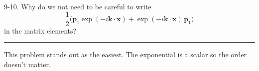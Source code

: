 \documentclass[12pt]{article}
\begin{document}
9-10.
Why do we not need to be careful to write
\begin{equation*}
\frac{1}{2}
\big(
\mathbf p_1\exp(-i\mathbf k\cdot\mathbf x)
+\exp(-i\mathbf k\cdot\mathbf x)\,\mathbf p_1
\big)
\end{equation*}
in the matrix elements?

\bigskip
\hrule

\bigskip
This problem stands out as the easiest.
The exponential is a scalar so the order doesn't matter.
\end{document}
